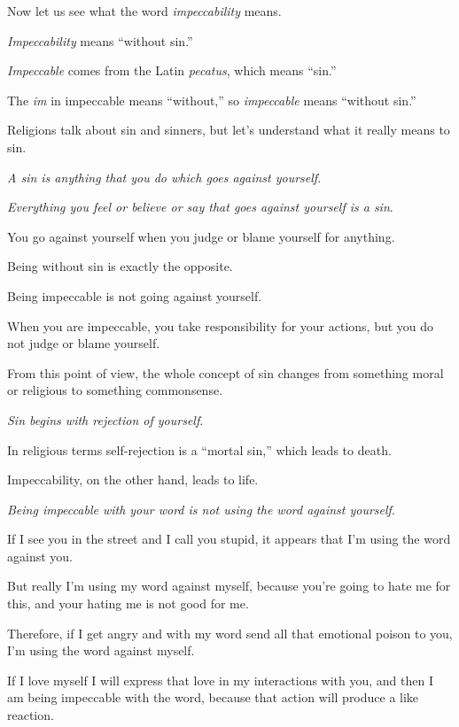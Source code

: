 \documentclass{article}
\numberwithin{equation}{section}
\begin{document}
Now let us see what the word \textit{impeccability} means.

\textit{Impeccability} means ``without sin.''

\textit{Impeccable} comes from the Latin \textit{pecatus}, which means ``sin.''

The \textit{im} in impeccable means ``without,'' so \textit{impeccable} means ``without sin.''

Religions talk about sin and sinners, but let's understand what it really means to sin.

\textit{A sin is anything that you do which goes against yourself}.

\textit{Everything you feel or believe or say that goes against yourself is a sin}.

You go against yourself when you judge or blame yourself for anything.

Being without sin is exactly the opposite.

Being impeccable is not going against yourself.

When you are impeccable, you take responsibility for your actions, but you do not judge or blame yourself.

%
From this point of view, the whole concept of sin changes from something moral or religious to something commonsense.

\textit{Sin begins with rejection of yourself}.


In religious terms self-rejection is a ``mortal sin,'' which leads to death.

Impeccability, on the other hand, leads to life.

%
\textit{Being impeccable with your word is not using the word against yourself}.

If I see you in the street and I call you stupid, it appears that I'm using the word against you.

But really I'm using my word against myself, because you're going to hate me for this, and your hating me is not good for me.

Therefore, if I get angry and with my word send all that emotional poison to you, I'm using the word against myself.

%
If I love myself I will express that love in my interactions with you, and then I am being impeccable with the word, because that action will produce a like reaction.
\end{document}
